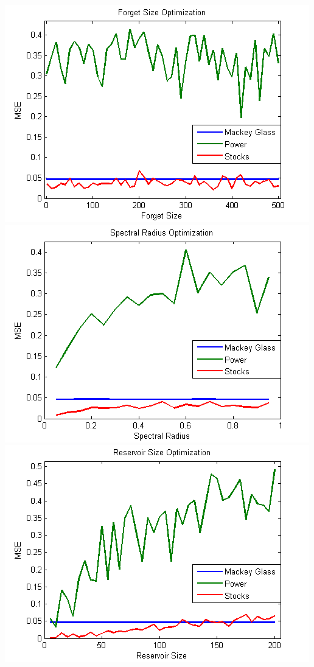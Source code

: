 \documentclass{acm_proc_article-sp}
\begin{document}
\includegraphics[scale=0.7]{ForgetSizeOptimization.png}
\includegraphics[scale=0.7]{SpectralRadiusOptimization.png}
\includegraphics[scale=0.7]{ReservoirSizeOptimization.png}
\end{document}
